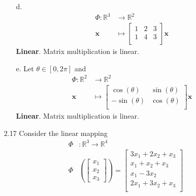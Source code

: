 \documentclass[11pt]{article}
\newcommand{\R}{\mathbb{R}}
\theoremstyle{definition}
\theoremstyle{plain}
\theoremstyle{remark}
\begin{document}
\begin{enumerate}
\begin{enumerate}
              \item[d.]
                    \[
                        \begin{aligned}
                            \Phi : \R^3 & \rightarrow \R^2 \\
                            \mathbf{x}  & \mapsto
                            \begin{bmatrix}
                                1 & 2 & 3 \\
                                1 & 4 & 3 \\
                            \end{bmatrix}
                            \mathbf{x}
                        \end{aligned}
                    \]
                    \textbf{Linear}. Matrix multiplication is linear.

              \item[e.] Let \(\theta \in [0, 2\pi]\) and
                    \[
                        \begin{aligned}
                            \Phi : \R^2 & \rightarrow \R^2 \\
                            \mathbf{x}  & \mapsto
                            \begin{bmatrix}
                                \cos(\theta)  & \sin(\theta) \\
                                -\sin(\theta) & \cos(\theta) \\
                            \end{bmatrix}
                            \mathbf{x}
                        \end{aligned}
                    \]
                    \textbf{Linear}. Matrix multiplication is linear.

          \end{enumerate}

          \pagebreak

    \item[2.17] Consider the linear mapping
          \[
              \begin{aligned}
                  \Phi & : \R^3 \rightarrow \R^4 \\
                  \Phi & \left (
                  \begin{bmatrix}
                      x_1 \\ x_2 \\ x_3
                  \end{bmatrix}
                  \right )
                  = \begin{bmatrix}
                        3x_1 + 2x_2 + x_3 \\
                        x_1 + x_2 + x_3   \\
                        x_1 - 3 x_2       \\
                        2x_1 + 3x_2 + x_3 \\
                    \end{bmatrix}
              \end{aligned}
          \]


\end{enumerate}
\end{document}
